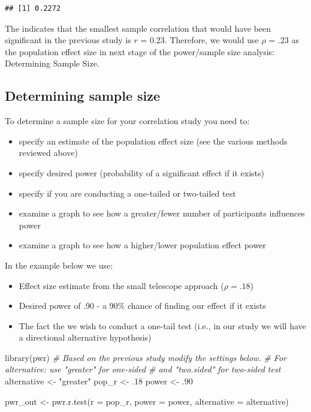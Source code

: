 \documentclass[
]{krantz}
\makeatletter
\newenvironment{Shaded}{\begin{snugshade}}{\end{snugshade}}
\newcommand{\AttributeTok}[1]{\textcolor[rgb]{0.61,0.61,0.61}{#1}}
\newcommand{\CommentTok}[1]{\textcolor[rgb]{0.37,0.37,0.37}{\textit{#1}}}
\newcommand{\DecValTok}[1]{\textcolor[rgb]{0.06,0.06,0.06}{#1}}
\newcommand{\FunctionTok}[1]{\textcolor[rgb]{0,0,0}{#1}}
\newcommand{\NormalTok}[1]{#1}
\newcommand{\OtherTok}[1]{\textcolor[rgb]{0.37,0.37,0.37}{#1}}
\newcommand{\StringTok}[1]{\textcolor[rgb]{0.5,0.5,0.5}{#1}}
\newenvironment{kframe}{%
\medskip{}
\setlength{\fboxsep}{.8em}
 \def\at@end@of@kframe{}%
 \ifinner\ifhmode%
  \def\at@end@of@kframe{\end{minipage}}%
  \begin{minipage}{\columnwidth}%
 \fi\fi%
 \def\FrameCommand##1{\hskip\@totalleftmargin \hskip-\fboxsep
 \colorbox{shadecolor}{##1}\hskip-\fboxsep
     \hskip-\linewidth \hskip-\@totalleftmargin \hskip\columnwidth}%
 \MakeFramed {\advance\hsize-\width
   \@totalleftmargin\z@ \linewidth\hsize
   \@setminipage}}%
 {\par\unskip\endMakeFramed%
 \at@end@of@kframe}
\renewenvironment{Shaded}{\begin{kframe}}{\end{kframe}}
\makeatother
\begin{document}
\begin{verbatim}
## [1] 0.2272
\end{verbatim}

The indicates that the smallest sample correlation that would have been significant in the previous study is \(r\) = 0.23. Therefore, we would use \(\rho\) = .23 as the population effect size in next stage of the power/sample size analysis: Determining Sample Size.

\hypertarget{determining-sample-size-2}{%
\subsection{Determining sample size}\label{determining-sample-size-2}}

To determine a sample size for your correlation study you need to:

\begin{itemize}
\item
  specify an estimate of the population effect size (see the various methods reviewed above)
\item
  specify desired power (probability of a significant effect if it exists)
\item
  specify if you are conducting a one-tailed or two-tailed test
\item
  examine a graph to see how a greater/fewer number of participants influences power
\item
  examine a graph to see how a higher/lower population effect power
\end{itemize}

In the example below we use:

\begin{itemize}
\item
  Effect size estimate from the small telescope approach (\(\rho = .18\))
\item
  Desired power of .90 - a 90\% chance of finding our effect if it exists
\item
  The fact the we wish to conduct a one-tail test (i.e., in our study we will have a directional alternative hypothesis)
\end{itemize}

\begin{Shaded}
\begin{Highlighting}[]
\FunctionTok{library}\NormalTok{(pwr)}
\CommentTok{\# Based on the previous study modify the settings below.}
\CommentTok{\# For alternative: use "greater" for one{-}sided }
\CommentTok{\# and "two.sided" for two{-}sided test}
\NormalTok{alternative }\OtherTok{\textless{}{-}} \StringTok{"greater"}
\NormalTok{pop\_r }\OtherTok{\textless{}{-}}\NormalTok{ .}\DecValTok{18}
\NormalTok{power }\OtherTok{\textless{}{-}}\NormalTok{ .}\DecValTok{90}

\NormalTok{pwr\_out }\OtherTok{\textless{}{-}} \FunctionTok{pwr.r.test}\NormalTok{(}\AttributeTok{r =}\NormalTok{ pop\_r, }
                      \AttributeTok{power =}\NormalTok{ power,}
                      \AttributeTok{alternative =}\NormalTok{ alternative)}
\end{Highlighting}
\end{Shaded}
\end{document}

